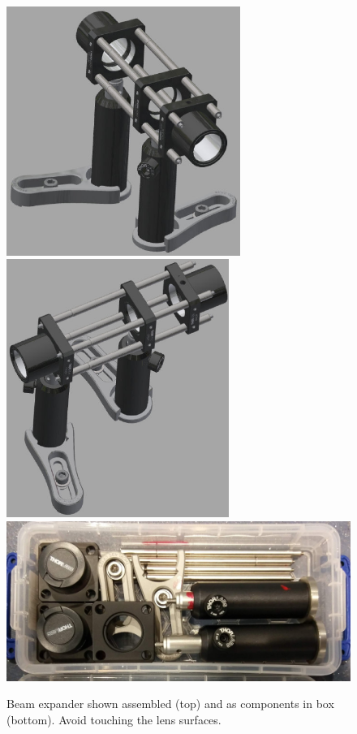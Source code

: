 \documentclass[a4paper]{report}
\begin{document}
\begin{figure}[h]
\center
\includegraphics[width=3in]{expander_CAD_01.eps}
\includegraphics[width=2.85in]{expander_CAD_02.eps}
\includegraphics[width=5in]{beam_expander_box.eps}
\caption{Beam expander shown assembled (top) and as components in box (bottom). Avoid touching the lens surfaces.}
\label{fig:beamExpander}
\end{figure}
\end{document}
